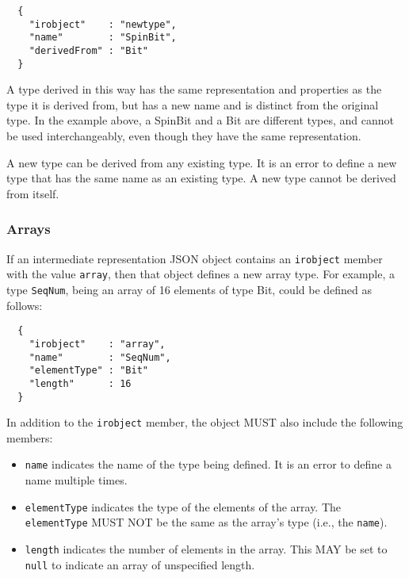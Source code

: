 \documentclass[twocolumn,a4paper]{article}
\begin{document}
\begin{verbatim}
  {
    "irobject"    : "newtype",
    "name"        : "SpinBit",
    "derivedFrom" : "Bit"
  }
\end{verbatim}

A type derived in this way has the same representation and properties as
the type it is derived from, but has a new name and is distinct from the
original type.  In the example above, a SpinBit and a Bit are different
types, and cannot be used interchangeably, even though they have the same
representation.

A new type can be derived from any existing type. It is an error to define
a new type that has the same name as an existing type. A new type cannot be
derived from itself.

\subsubsection{Arrays}

If an intermediate representation JSON object contains an \texttt{irobject}
member with the value \texttt{array}, then that object defines a new array
type. For example, a type \texttt{SeqNum}, being an array of 16 elements of
type Bit, could be defined as follows:

\begin{verbatim}
  {
    "irobject"    : "array",
    "name"        : "SeqNum",
    "elementType" : "Bit"
    "length"      : 16
  }
\end{verbatim}

In addition to the \texttt{irobject} member, the object MUST also include
the following members:
\begin{itemize}
  \item \texttt{name} indicates the name of the type being defined. It is
    an error to define a name multiple times.
  \item \texttt{elementType} indicates the type of the elements of the
    array. The \texttt{elementType} MUST NOT be the same as the array's
    type (i.e., the \texttt{name}).
  \item \texttt{length} indicates the number of elements in the array. This
    MAY be set to \texttt{null} to indicate an array of unspecified length.
\end{itemize}

\end{document}
